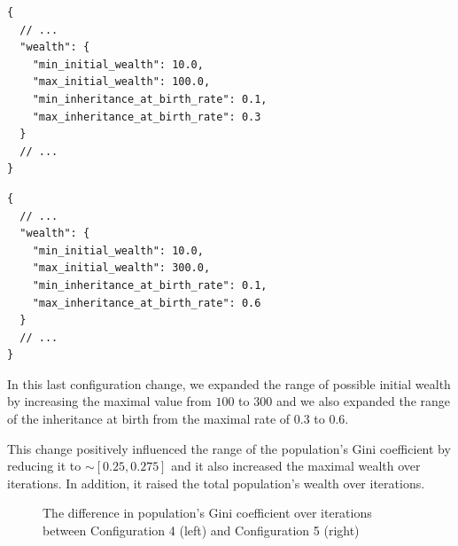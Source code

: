 \documentclass[english]{projectreport}
\begin{document}
\begin{minipage}{0.48\textwidth}
\begin{verbatim}
{
  // ...
  "wealth": {
    "min_initial_wealth": 10.0,
    "max_initial_wealth": 100.0,
    "min_inheritance_at_birth_rate": 0.1,
    "max_inheritance_at_birth_rate": 0.3
  }
  // ...
}
\end{verbatim}
\end{minipage}
\hfill
\begin{minipage}{0.48\textwidth}
\begin{verbatim}
{
  // ...
  "wealth": {
    "min_initial_wealth": 10.0,
    "max_initial_wealth": 300.0,
    "min_inheritance_at_birth_rate": 0.1,
    "max_inheritance_at_birth_rate": 0.6
  }
  // ...
}
\end{verbatim}
\end{minipage}

    In this last configuration change, we expanded the range of possible initial wealth by increasing the maximal value from $100$ to $300$ and we also expanded the range of the inheritance at birth from the maximal rate of $0.3$ to $0.6$.

    This change positively influenced the range of the population's Gini coefficient by reducing it to $\sim [0.25, 0.275]$ and it also increased the maximal wealth over iterations. In addition, it raised the total population's wealth over iterations.

\begin{figure}[H]
\begin{center}
%
\end{center}
\caption{The difference in population's Gini coefficient over iterations between Configuration 4 (left) and Configuration 5 (right)}
\end{figure}
\end{document}
